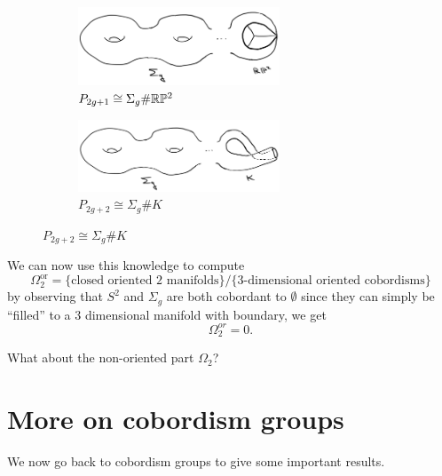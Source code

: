 \begin{prop}
\begin{enumerate}
\begin{figure}[!ht]
            \begin{subfigure}[t]{.4\textwidth}
                \centering
                \includegraphics[width=6cm]{images/Lecture 3/sigma_g_rp2.png}
                \caption{$P_{2g+1} \cong \Sigma_g \# \mathbb{R}\mathbb{P}^2$}
            \end{subfigure}\hspace{10mm}
            \begin{subfigure}[t]{.4\textwidth}
                \centering
                \includegraphics[width=6cm]{images/Lecture 3/sigma_g_klein_bottle.png}
                \caption{$P_{2g+2} \cong \Sigma_g \# K$}
            \end{subfigure}
        \end{figure}
    \end{enumerate}
\end{prop}

\noindent We can now use this knowledge to compute
$$
\Omega_2^{\text{or}} = \{\text{closed oriented $2$ manifolds} \} /\{\text{$3$-dimensional oriented cobordisms}\}
$$
by observing that $S^2$ and $\Sigma_g$ are both cobordant to $\emptyset$ since they can simply be ``filled'' to a $3$ dimensional manifold with boundary, we get
\begin{equation}
    \Omega_2^{or} = 0.
\end{equation} 
\begin{exercise}
    What about the non-oriented part $\Omega_2$?
\end{exercise}

\section{More on cobordism groups}
\label{sec:more_on_cobordism_groups}

We now go back to cobordism groups to give some important results.

